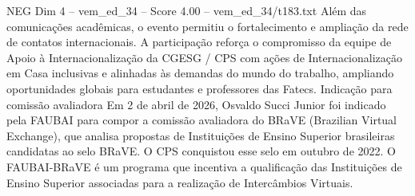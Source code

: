 \begin{textsample}{NEG Dim 4 – vem\_ed\_34 – Score 4.00 – vem\_ed\_34/t183.txt}
Além das comunicações acadêmicas, o evento permitiu o fortalecimento e ampliação da rede de contatos internacionais.
A participação reforça o compromisso da equipe de Apoio à Internacionalização da CGESG / CPS com ações de Internacionalização em Casa inclusivas e alinhadas às demandas do mundo do trabalho, ampliando oportunidades globais para estudantes e professores das Fatecs.
Indicação para comissão avaliadora Em 2 de abril de 2026, Osvaldo Succi Junior foi indicado pela FAUBAI para compor a comissão avaliadora do BRaVE (Brazilian Virtual Exchange), que analisa propostas de Instituições de Ensino Superior brasileiras candidatas ao selo BRaVE.
O CPS conquistou esse selo em outubro de 2022.
O FAUBAI-BRaVE é um programa que incentiva a qualificação das Instituições de Ensino Superior associadas para a realização de Intercâmbios Virtuais.

\end{textsample}
